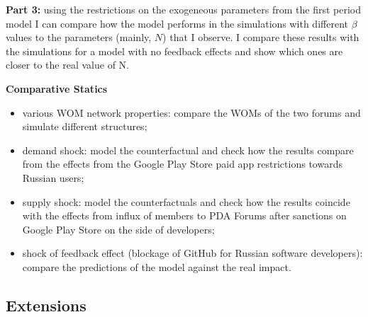\documentclass{article}
\numberwithin{figure}{section}
\numberwithin{table}{section}
\theoremstyle{indented}
\numberwithin{equation}{section} %
\begin{document}
\textbf{Part 3:} using the restrictions on the exogeneous parameters from the first period model I can compare how the model performs in the simulations with different $\beta$ values to the parameters (mainly, $N$) that I observe. I compare these results with the simulations for a model with no feedback effects and show which ones are closer to the real value of N.

\textbf{Comparative Statics}
\begin{itemize}
    \item various WOM network properties:
    compare the WOMs of the two forums and simulate different structures;
    \item demand shock: 
    model the counterfactual and check how the results compare from the effects from the Google Play Store paid app restrictions towards Russian users;
    \item supply shock: 
    model the counterfactuals and check how the results coincide with the effects from influx of members to PDA Forums after sanctions on Google Play Store on the side of developers;
    \item shock of feedback effect (blockage of GitHub for Russian software developers): compare the predictions of the model against the real impact.
\end{itemize}

\subsection{Extensions}




\end{document}
